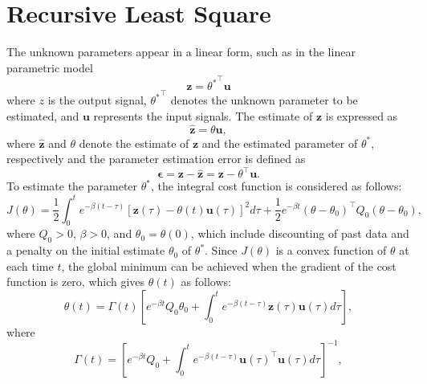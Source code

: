 

\appendix
\chapter{Recursive Least Square}\label{Appen1}
The unknown parameters appear in a linear form, such as in the linear parametric model
\begin{equation}
    \mathbf{z} = {\theta^*}^\top \mathbf{u}
\end{equation}
where \(z\) is the output signal, \({\theta^*}^\top\) denotes the unknown parameter to be estimated, and \(\mathbf{u}\) represents the input signals. The estimate of $\mathbf{z}$ is expressed as
\begin{equation}
\hat{\mathbf{z}} = \theta\mathbf{u},
\end{equation}
where \(\hat{\mathbf{z}}\) and \(\theta\) denote the estimate of \(\mathbf{z}\) and the estimated parameter of \(\theta^*\), respectively and the parameter estimation error is defined as
\begin{equation}
\boldsymbol{\epsilon} =\mathbf{z} - \hat{\mathbf{z}} = \mathbf{z} - \theta^\top \boldsymbol{u}.
\end{equation}
To estimate the parameter $\theta^*$, the integral cost function \cite{c3.2_4} is considered as follows:
\begin{equation}
J(\theta) = \frac{1}{2} \int_{0}^{t} e^{-\beta(t-\tau)} \left[ \mathbf{z}(\tau) - \theta(t) \boldsymbol{u}(\tau) \right]^2 d\tau + \frac{1}{2} e^{-\beta t} (\theta - \theta_0)^\top Q_0 (\theta - \theta_0),
\end{equation}
where \( Q_0 > 0 \), \( \beta > 0 \), and \( \theta_0 = \theta(0) \), which include discounting of past data and a penalty on the initial estimate \(\theta_0\) of \(\theta^*\). Since \( J(\theta) \) is a convex function of \(\theta\) at each time \( t \), the global minimum can be achieved when the gradient of the cost function is zero, which gives \(\theta(t)\) as follows:
\begin{equation}
\theta(t) = \Gamma(t) \left[ e^{-\beta t} Q_0 \theta_0 + \int_{0}^{t} e^{-\beta (t - \tau)} \mathbf{z}(\tau) \boldsymbol{u}(\tau) d\tau \right],
\end{equation}
where
\begin{equation}
\Gamma(t) = \left[ e^{-\beta t} Q_0 + \int_{0}^{t} e^{-\beta(t - \tau)} \mathbf{u}(\tau)^\top \mathbf{u}(\tau) d\tau \right]^{-1},
\end{equation}

